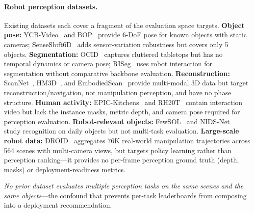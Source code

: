 \paragraph{Robot perception datasets.}
Existing datasets each cover a fragment of the evaluation space \coolname{} targets.
\textbf{Object pose:} YCB-Video~\citep{xiang2018posecnn} and BOP~\citep{hodan2024bop} provide 6-DoF pose for known objects with static cameras; SenseShift6D~\citep{han2025senseshift6d} adds sensor-variation robustness but covers only 5 objects.
\textbf{Segmentation:} OCID~\citep{suchi2019ocid} captures cluttered tabletops but has no temporal dynamics or camera pose; RISeg~\citep{qian2024riseg} uses robot interaction for segmentation without comparative backbone evaluation.
\textbf{Reconstruction:} ScanNet~\citep{dai2017scannet}, HM3D~\citep{ramakrishnan2021hm3d}, and EmbodiedScan~\citep{wang2024embodiedscan} provide multi-modal 3D data but target reconstruction/navigation, not manipulation perception, and have no phase structure.
\textbf{Human activity:} EPIC-Kitchens~\citep{damen2018epic} and RH20T~\citep{fang2023rh20t} contain interaction video but lack the instance masks, metric depth, and camera pose required for perception evaluation.
\textbf{Robot-relevant objects:} FewSOL~\citep{padalunkal2023fewsol} and NIDS-Net~\citep{lu2025nidsnet} study recognition on daily objects but not multi-task evaluation.
\textbf{Large-scale robot data:} DROID~\citep{khazatsky2024droid} aggregates 76K real-world manipulation trajectories across 564 scenes with multi-camera views, but targets policy learning rather than perception ranking---it provides no per-frame perception ground truth (depth, masks) or deployment-readiness metrics.

\textit{No prior dataset evaluates multiple perception tasks on the same scenes and the same objects}---the confound that prevents per-task leaderboards from composing into a deployment recommendation.

